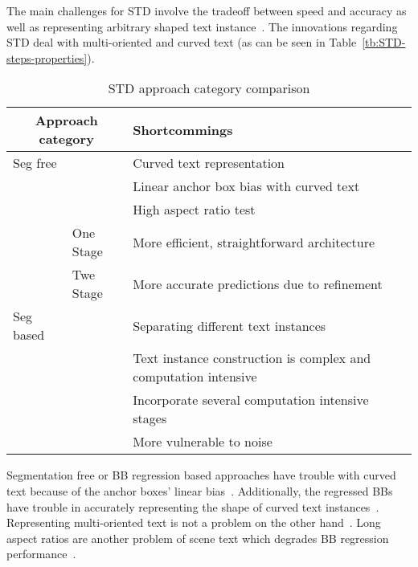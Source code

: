 The main challenges for \ac{STD} involve the tradeoff between speed and accuracy as well as
representing arbitrary shaped text instance~\citep{wang_efficient_2019}.
The innovations regarding \ac{STD} deal with multi-oriented and curved text (as can be seen in
Table~\ref{tb:STD-steps-properties}).
\begin{table}[h]
    \centering\scriptsize
    \begin{tabular}{p{}p{}p{}}
        \multicolumn{2}{c}{\textbf{Approach category}} & \textbf{Shortcommings} \\
        \toprule
        Seg free & & Curved text representation~\citep{long_scene_2021,wang_shape_2019} \\
        & & Linear anchor box bias with curved text~\citep{wang_shape_2019,ferrari_textsnake_2018} \\
        & & High aspect ratio test~\citep{shi_detecting_2017,long_scene_2021} \\
        & One Stage & More efficient, straightforward architecture~\citep{lu_mimicdet_2020} \\
        & Twe Stage & More accurate predictions due to refinement~\citep{lu_mimicdet_2020} \\
        \midrule
        Seg based & & Separating different text instances~\citep{wang_shape_2019} \\
        & & Text instance construction is complex and computation
            intensive~\citep{xie_aggregation_2019,liao_real-time_2019,qiao_text_2021} \\
        & & Incorporate several computation intensive stages~\citep{dai_fused_2018} \\
        & & More vulnerable to noise~\citep{long_scene_2021} \\
        \bottomrule
    \end{tabular}
    \caption{STD approach category comparison\label{tb:STD-comparison}}
\end{table}
Segmentation free or \ac{BB} regression based approaches have trouble with curved text because of
the anchor boxes' linear bias~\citep{wang_shape_2019,ferrari_textsnake_2018}.
Additionally, the regressed \acp{BB} have trouble in accurately representing the shape of curved
text instances~\citep{long_scene_2021,wang_shape_2019}.
Representing multi-oriented text is not a problem on the other
hand~\citep{liao_textboxes_2018,jiang_r2cnn_2017}.
Long aspect ratios are another problem of scene text which degrades \ac{BB} regression
performance~\citep{shi_detecting_2017,long_scene_2021}.

